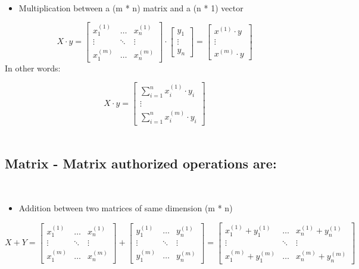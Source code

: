 \documentclass[]{article}
\providecommand{\tightlist}{%
  \setlength{\itemsep}{0pt}\setlength{\parskip}{0pt}}
\begin{document}
​

\begin{itemize}
\tightlist
\item
  Multiplication between a (m * n) matrix and a (n * 1) vector
\end{itemize}

\large

\[
X \cdot y = 
\begin{bmatrix} x^{(1)}_1 & \dots& x^{(1)}_n \\ 
\vdots & \ddots & \vdots \\ 
x^{(m)}_1 & \dots & x^{(m)}_n
\end{bmatrix} 
\cdot 
\begin{bmatrix} 
y_1 \\
\vdots \\ 
y_n 
\end{bmatrix} 
= 
\begin{bmatrix} x^{(1)} \cdot y \\ \vdots  \\ x^{(m)} \cdot y \end{bmatrix}
\] \normalsize ​ In other words:

\large

\[
X \cdot y = \begin{bmatrix} \sum_{i = 1}^{n} x_{i}^{(1)} \cdot y_i \\ \vdots \\ \sum_{i = 1}^{n} x_{i}^{(m)} \cdot y_i \end{bmatrix}
\] \normalsize ​

\hypertarget{matrix---matrix-authorized-operations-are}{%
\subsection{Matrix - Matrix authorized operations
are:}\label{matrix---matrix-authorized-operations-are}}

​

\begin{itemize}
\tightlist
\item
  Addition between two matrices of same dimension (m * n)
\end{itemize}

\large

\[
X + Y = 
\begin{bmatrix} 
x_{1}^{(1)} & \dots & x_{n}^{(1)}  \\ 
\vdots & \ddots & \vdots \\ 
x_{1}^{(m)} & \dots & x_{n}^{(m)} 
\end{bmatrix} +  
\begin{bmatrix} 
y_{1}^{(1)} & \dots & y_{n}^{(1)}  \\ 
\vdots & \ddots & \vdots \\ 
y_{1}^{(m)} & \dots & y_{n}^{(m)} 
\end{bmatrix} = 
\begin{bmatrix} 
x_{1}^{(1)} + y_{1}^{(1)}  & \dots & x_{n}^{(1)} + y_{n}^{(1)}  \\ 
\vdots & \ddots & \vdots \\ 
x_{1}^{(m)} + y_{1}^{(m)} & \dots & x_{n}^{(m)} + y_{n}^{(m)}
\end{bmatrix}
\] \normalsize ​
\end{document}
